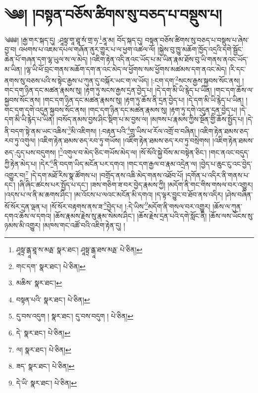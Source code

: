 \setcounter{footnote}{0} 
\chapter{༄༅། །བསྟན་བཅོས་ཚིགས་སུ་བཅད་པ་བསྡུས་པ།}༄༅༅། །རྒྱ་གར་སྐད་དུ། :ཤཱསྟྲ་གཱ་ཐཱ་སཾ་གྲ་ཧ་\footnote{ཤཱསྟྲ་ནྒཱ་ཐཱ་ས་མརྠ་  སྣར་ཐང་། ཤཱསྟྲ་ནྒཱ་ཐས་མརྠ་  པེ་ཅིན། }ནཱ་མ། བོད་སྐད་དུ། བསྟན་བཅོས་ཚིགས་སུ་བཅད་པ་བསྡུས་པ་ཞེས་བྱ་བ། འཕགས་པ་འཇམ་དཔལ་གཞོན་ནུར་གྱུར་པ་ལ་ཕྱག་འཚལ་ལོ། །སྐྱེས་བུ་ཁྱུ་མཆོག་ཁྱོད་འདྲའི་དགེ་སྦྱོང་ཆེན་པོ་གཞན་དག་ལྷ་ཡུལ་ས་ལ་མེད། །འཇིག་རྟེན་འདི་ནའང་ཡོད་པ་མ་ཡིན་རྣམ་ཐོས་བུ་ཡི་གནས་ནའང་ཡོད་མ་ཡིན། །ལྷ་ཡི་ཕོ་བྲང་གནས་མཆོག་དག་ན་འང་མེད་ལ་ཕྱོགས་སམ་ཕྱོགས་མཚམས་དག་ནའང་མེད། །རི་དང་ནགས་སུ་བཅས་པའི་ས་སྟེང་རྒྱས་པ་ཀུན་དུ་བསྐོར་ཡང་ག་ལ་ཡོད། །:ངག་དག་\footnote{གང་དག་  སྣར་ཐང་།  པེ་ཅིན། }སངས་རྒྱས་སྐྱབས་སོང་ནས། །གང་དག་ཉིན་དང་མཚན་རྣམས་སུ། །རྟག་ཏུ་སངས་རྒྱས་དྲན་བྱེད་པ། །དེ་དག་མི་ཡི་རྙེད་པ་ཡིན། །གང་དག་ཆོས་ལ་སྐྱབས་སོང་ནས། །གང་དག་ཉིན་དང་མཚན་རྣམས་སུ། །རྟག་ཏུ་ཆོས་ནི་དྲན་བྱེད་པ། །དེ་དག་མི་ཡི་རྙེད་པ་ཡིན། །གང་དག་དགེ་འདུན་སྐྱབས་སོང་ནས། །གང་དག་ཉིན་དང་མཚན་རྣམས་སུ། །རྟག་ཏུ་དགེ་འདུན་དྲན་བྱེད་པ། །དེ་དག་མི་ཡི་རྙེད་པ་ཡིན། །བསོད་ནམས་བྱས་ཤིང་སྡིག་པ་མ་བྱས་ལ། །མཁས་པ་རྣམས་ཀྱིས་སྔོན་གྱི་ཆོས་སྤྱོད་པ། །དེ་ནི་བདག་སྟེ་ནམ་ཡང་འཆིས་\footnote{མཆིས་  སྣར་ཐང་། }མི་འཇིགས། །:བརྟན་པའི་\footnote{བསྟན་པའི་  སྣར་ཐང་།  པེ་ཅིན། }གྲུ་ཡིས་ཕ་རོལ་འགྲོ་བ་བཞིན། །འཇིག་རྟེན་ཐམས་ཅད་རབ་ཏུ་འགུལ། །འཇིག་རྟེན་ཐམས་ཅད་རབ་ཏུ་གཡོས། །འཇིག་རྟེན་ཐམས་ཅད་རབ་ཏུ་བསྲེགས། །འཇིག་རྟེན་ཐམས་ཅད་:དུད་པས་བདུགས། །\footnote{དུ་བས་འདུག །  སྣར་ཐང་། དུ་བས་བདུག །  པེ་ཅིན། }འགུལ་བ་མེད་ཅིང་གཡོས་མེད་ལ། །སོ་སོའི་སྐྱེ་བོས་མ་བསྟེན་ཅིང་། །གང་ནའང་བདུད་ཀྱི་རྟེན་མེད་པ། །དེར་\footnote{དེ་  སྣར་ཐང་།  པེ་ཅིན། }ནི་བདག་ཡིད་མངོན་པར་དགའ། །གང་དག་རྒྱལ་བ་རྣམ་འདྲེན་ལ། །བྱེད་པ་ཆུང་ངུ་འང་བྱེད་འགྱུར་བ།\footnote{ལ།  སྣར་ཐང་།  པེ་ཅིན། } །དེ་དག་མཐོ་རིས་སྣ་ཚོགས་པ། །བགྲོད་ནས་འཆི་མེད་གནས་འཐོབ་པོ། །དགོན་པ་འདིར་ནི་གནས་པ་དང་། །ཞི་ཞིང་ཚངས་པར་སྤྱོད་པ་དང་། །ཟས་གཅིག་ཟ་བར་བྱེད་རྣམས་ཀྱི། །མདོག་ནི་གང་གིས་གསལ་བར་འགྱུར། །འདས་པ་ལ་ནི་མ་ཆགས་ཤིང་། །མ་འོངས་པ་ལའང་མངོན་མི་དགའ། །ད་ལྟར་བྱུང་བ་ཐོབ་ནས་འདིར། །ཤེས་བཞིན་སོ་སོར་དྲན་ལྡན་པ། །སོ་སོར་བརྟགས་ནས་ཟ་\footnote{ཟད་  སྣར་ཐང་།  པེ་ཅིན། }བྱེད་པ། །:དེ་ཡིས་\footnote{དེ་ཡི་  སྣར་ཐང་།  པེ་ཅིན། }མདོག་ནི་གསལ་བར་འགྱུར། །ཆོས་ལ་ཀུན་དགའ་ཆོས་ལ་དགའ། །ཆོས་རྣམས་རྗེས་སུ་རྣམ་སེམས་ཤིང་། །ཆོས་རྗེས་དྲན་པའི་དགེ་སློང་ནི། །ཆོས་ལས་ཡོངས་སུ་ཉམས་མི་འགྱུར། །མཁས་གང་འཚོ་བའི་འཇིག་རྟེན་དུ། །

